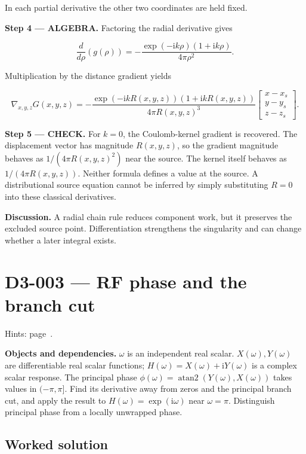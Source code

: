 \documentclass[11pt,oneside,openany]{book}
\begin{document}
In each partial derivative the other two coordinates are held fixed.

\begingroup\color{AlgebraBlue}
\textbf{Step 4 --- ALGEBRA.} Factoring the radial derivative gives

\[
\frac{d}{d\rho}\left(g(\rho)\right)
=-\frac{\exp(-\mathrm{i}k\rho)(1+\mathrm{i}k\rho)}{4\pi\rho^2}.
\]

Multiplication by the distance gradient yields

\[
\nabla_{x,y,z}G(x,y,z)
=-\frac{\exp(-\mathrm{i}kR(x,y,z))(1+\mathrm{i}kR(x,y,z))}{4\pi R(x,y,z)^3}
\begin{bmatrix}x-x_s\\y-y_s\\z-z_s\end{bmatrix}.
\]

\endgroup
\textbf{Step 5 --- CHECK.} For \(k=0\), the Coulomb-kernel gradient is recovered. The displacement vector has magnitude \(R(x,y,z)\), so the gradient magnitude behaves as \(1/(4\pi R(x,y,z)^2)\) near the source. The kernel itself behaves as \(1/(4\pi R(x,y,z))\). Neither formula defines a value at the source. A distributional source equation cannot be inferred by simply substituting \(R=0\) into these classical derivatives.

\textbf{Discussion.} A radial chain rule reduces component work, but it preserves the excluded source point. Differentiation strengthens the singularity and can change whether a later integral exists.
\clearpage
\section{D3-003 --- RF phase and the branch cut}
\label{problem:D3-003}
{\small Hints: page~\pageref{hints:D3-003}.}\par\medskip

\textbf{Objects and dependencies.} \(\omega\) is an independent real scalar. \(X(\omega),Y(\omega)\) are differentiable real scalar functions; \(H(\omega)=X(\omega)+\mathrm{i}Y(\omega)\) is a complex scalar response. The principal phase \(\phi(\omega)=\operatorname{atan2}(Y(\omega),X(\omega))\) takes values in \((-\pi,\pi]\). Find its derivative away from zeros and the principal branch cut, and apply the result to \(H(\omega)=\exp(\mathrm{i}\omega)\) near \(\omega=\pi\). Distinguish principal phase from a locally unwrapped phase.
\subsection*{Worked solution}
\end{document}
